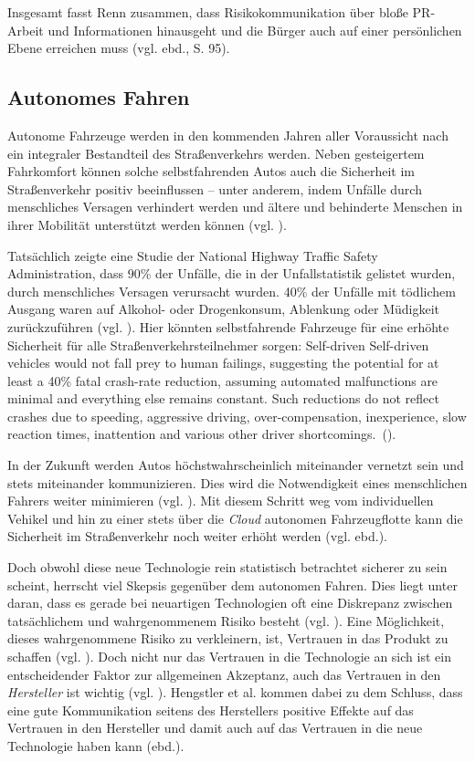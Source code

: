 Insgesamt fasst Renn zusammen, dass Risikokommunikation über bloße PR-Arbeit und Informationen hinausgeht und die Bürger auch auf einer persönlichen Ebene erreichen muss (vgl. ebd., S. 95).

\subsection{Autonomes Fahren}

Autonome Fahrzeuge werden in den kommenden Jahren aller Voraussicht nach ein integraler Bestandteil des Straßenverkehrs werden. Neben gesteigertem Fahrkomfort können solche selbstfahrenden Autos auch die Sicherheit im Straßenverkehr positiv beeinflussen – unter anderem, indem Unfälle durch menschliches Versagen verhindert werden und ältere und behinderte Menschen in ihrer Mobilität unterstützt werden können (vgl.  \cite[167]{fagnant2015preparing}).

Tatsächlich zeigte eine Studie der National Highway Traffic Safety Administration, dass 90\% der Unfälle, die in der Unfallstatistik gelistet wurden, durch menschliches Versagen verursacht wurden. 40\% der Unfälle mit tödlichem Ausgang waren auf Alkohol- oder Drogenkonsum, Ablenkung oder Müdigkeit zurückzuführen (vgl. \cite{singh2015critical}). Hier könnten selbstfahrende Fahrzeuge für eine erhöhte Sicherheit für alle Straßenverkehrsteilnehmer sorgen: \glqq Self-driven Self-driven vehicles would not fall prey to human failings, suggesting the potential for at least a 40\% fatal crash-rate reduction, assuming automated malfunctions are minimal and everything else remains constant. Such reductions do not reflect crashes due to speeding, aggressive driving, over-compensation, inexperience, slow reaction times, inattention and various other driver shortcomings.\grqq \ (\cite[169]{fagnant2015preparing}).

In der Zukunft werden Autos höchstwahrscheinlich miteinander vernetzt sein und stets miteinander kommunizieren. Dies wird die Notwendigkeit eines menschlichen Fahrers weiter minimieren (vgl. \cite[241]{gerla2014internet}). Mit diesem Schritt weg vom individuellen Vehikel und hin zu einer stets über die \emph{Cloud} autonomen Fahrzeugflotte kann die Sicherheit im Straßenverkehr noch weiter erhöht werden (vgl. ebd.).

Doch obwohl diese neue Technologie rein statistisch betrachtet sicherer zu sein scheint, herrscht viel Skepsis gegenüber dem autonomen Fahren. Dies liegt unter daran, dass es gerade bei neuartigen Technologien oft eine Diskrepanz zwischen tatsächlichem und wahrgenommenem Risiko besteht (vgl. \cite[106]{hengstler2016applied}). Eine Möglichkeit, dieses wahrgenommene Risiko zu verkleinern, ist, Vertrauen in das Produkt zu schaffen (vgl. \cite{rousseau1998not}). Doch nicht nur das Vertrauen in die Technologie an sich ist ein entscheidender Faktor zur allgemeinen Akzeptanz, auch das Vertrauen in den \emph{Hersteller} ist wichtig (vgl. \cite[107]{hengstler2016applied}). Hengstler et al. kommen dabei zu dem Schluss, dass eine gute Kommunikation seitens des Herstellers positive Effekte auf das Vertrauen in den Hersteller und damit auch auf das Vertrauen in die neue Technologie haben kann (ebd.).

